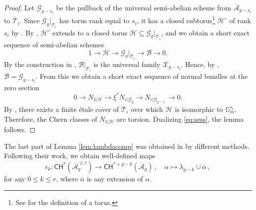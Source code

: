 \documentclass[11pt]{article}
\def\CH{\mathsf{CH}}
\def\Abar{\overline{\mathcal{A}}}
\theoremstyle{definition}
\begin{document}
\begin{proof}
    Let $\mathcal G_{g-s_i}$ be the pullback of the universal semi-abelian scheme from $\Abar_{g-s_i}$ to $\overline{\mathcal T}_i$. Since $\mathcal G_g \big|_{\mathcal T_i}$ has torus rank equal to $s_i$, it has a closed subtorus\footnote{See \cite[Definition I.2.1.]{FC} for the definition of a torus.} $\mathcal H^\circ $ of rank $s_i$ by \cite[Corollary I.2.11]{FC}. By \cite[Proposition I.2.9.]{FC}, $\mathcal H^\circ $ extends to a closed torus $\mathcal H \subseteq \mathcal G_g|_{\overline{\mathcal T}_i}$, and we obtain a short exact sequence of semi-abelian schemes
    $$
    1 \longrightarrow \mathcal H \longrightarrow\mathcal G_g|_{\overline{\mathcal T}_i} \longrightarrow \mathcal B \longrightarrow 0.
    $$
    By the construction in \cite[page 106]{FC}, $\mathcal B\big|_{\mathcal T_i}$ is the universal family $\mathcal X_{g-s_i}$. Hence, by \cite[Proposition I.2.7]{FC}, $\mathcal B = \mathcal G_{g-s_i}$. From this we obtain a short exact sequence of normal bundles at the zero section
    \begin{equation}\label{eq:sess}
    0 \longrightarrow N_{1|\mathcal H} \longrightarrow \xi^* N_{e|\mathcal G_g} \longrightarrow N_{e|\mathcal G_{g-s_i}} \longrightarrow 0.
    \end{equation}
    By \cite[Exp.~X Theorem~5.16]{SGA3II}, there exists a finite \'etale cover of $\overline{\mathcal T}_i$ over which $\mathcal H$ is isomorphic to $\mathbb G_m^{s_i}$. Therefore, the Chern classes of $N_{1|\mathcal H}$ are torsion. Dualizing \eqref{eq:sess}, the lemma follows.
\end{proof}

The last part of Lemma \ref{lem:lambdacomp} was obtained in \cite{CMOP} by different methods. Following their work, we obtain well-defined maps
$$
\epsilon_k: \CH^{*}(\overline{\mathcal{A}}_g^{\leq r}) \to \CH^{*+g-k}(\overline{\mathcal{A}}_g)\,, \quad \alpha \mapsto \lambda_{g-k} \cup \overline{\alpha}\, ,
$$
for any $0\le k \leq r$, where $\overline{\alpha}$ is any extension of $\alpha$.
\end{document}
